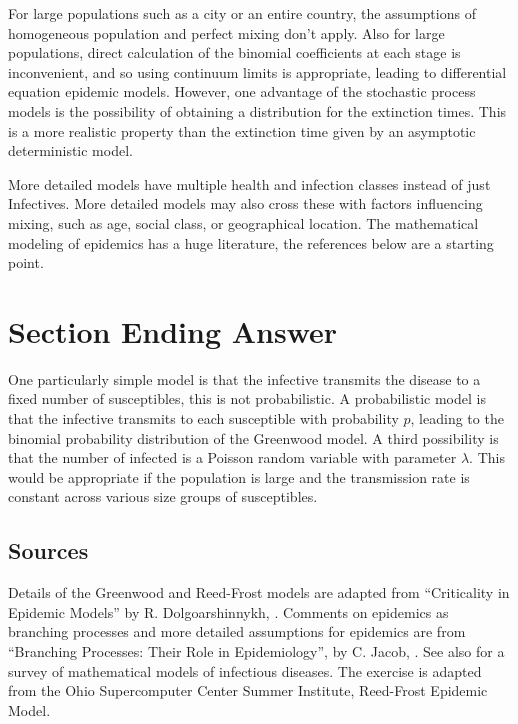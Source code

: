 \documentclass[12pt]{article}
\begin{document}
For large populations such as a city or an entire country, the
assumptions of homogeneous population and perfect mixing don't apply.
Also for large populations, direct calculation of the binomial
coefficients at each stage is inconvenient, and so using continuum
limits is appropriate, leading to differential equation epidemic models.
However, one advantage of the stochastic process models is the
possibility of obtaining a distribution for the extinction times.  This
is a more realistic property than the extinction time given by an
asymptotic deterministic model.

More detailed models have multiple health and infection classes instead
of just Infectives.  More detailed models may also cross these with
factors influencing mixing, such as age, social class, or geographical
location.  The mathematical modeling of epidemics has a huge literature,
the references below are a starting point.

\section*{Section Ending Answer}

One particularly simple model is that the infective transmits the
disease to a fixed number of susceptibles, this is not probabilistic.  A
probabilistic model is that the infective transmits to each susceptible
with probability \( p \), leading to the binomial probability
distribution of the Greenwood model.  A third possibility is that the
number of infected is a Poisson random variable with parameter \(
\lambda \).  This would be appropriate if the population is large and
the transmission rate is constant across various size groups of
susceptibles.

\subsection*{Sources}

Details of the Greenwood and Reed-Frost models are adapted from
``Criticality in Epidemic Models'' by R. Dolgoarshinnykh,
\cite{dolgoarshinnykh}.  Comments on epidemics as branching processes
and more detailed assumptions for epidemics are from ``Branching
Processes:  Their Role in Epidemiology'', by C. Jacob,
\cite{jacob10}.  See also
\cite{siettos13} for a survey of mathematical models of infectious
diseases.  The exercise is adapted from the Ohio Supercomputer Center
Summer Institute, 
{Reed-Frost Epidemic Model}.
\end{document}
